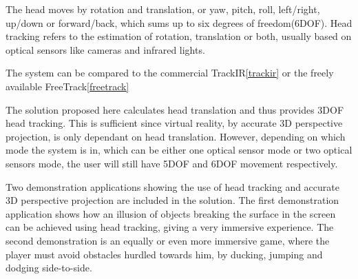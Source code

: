 The head moves by rotation and translation, or
yaw, pitch, roll, left/right, up/down or forward/back, which sums up to six degrees of freedom(6DOF).
Head tracking refers to the estimation of rotation, translation or both, usually based on 
optical sensors like cameras and infrared lights.

The system can be compared to the commercial TrackIR\ref{trackir} or the freely available FreeTrack\ref{freetrack}

The solution proposed here calculates head translation and thus provides 3DOF head tracking. 
This is sufficient since virtual reality, by accurate 3D perspective projection, is only dependant on head translation.
However, depending on which mode the system is in, which can be either one optical sensor mode or two optical sensors mode,
the user will still have 5DOF and 6DOF movement respectively. 

Two demonstration applications showing the use of head tracking and accurate 3D perspective projection are included in the solution.
The first demonstration application shows how an illusion of objects breaking the surface in the screen can be achieved using head tracking,
giving a very immersive experience. The second demonstration is an equally or even more immersive game, where the player must avoid
obstacles hurdled towards him, by ducking, jumping and dodging side-to-side.
